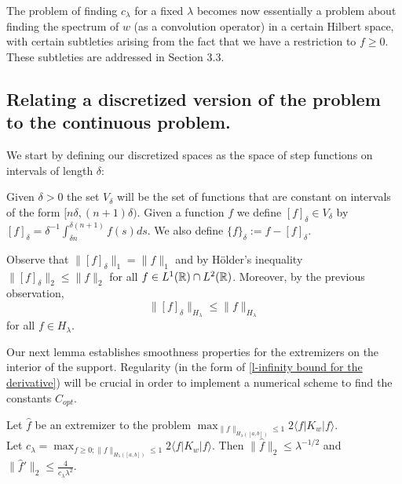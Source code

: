 The problem of finding $c_{\lambda}$ for a fixed $\lambda$ becomes now essentially a problem about finding the spectrum of $w$ (as a convolution operator) in a certain Hilbert space, with certain subtleties arising from the fact that we have a restriction to $f\ge 0$. These subtleties are addressed in Section 3.3. 

\subsection*{Relating a discretized version of the problem to the continuous problem.}  We start by defining our discretized spaces as the space of step functions on intervals of length $\delta$:


\begin{definition}
 Given $\delta>0$ the set $V_\delta$ will be the set of functions that are constant on intervals of the form $[n\delta, (n+1)\delta)$. Given a function $f$ we define $[f]_\delta \in V_\delta$ by $[f]_\delta = \delta^{-1}\int_{\delta n}^{\delta(n+1)} f(s) ds$. We also define $\{f\}_{\delta} := f-[f]_{\delta}$.
\end{definition}

Observe that $\|[f]_{\delta}\|_1=\|f\|_1$ and by H\"older's inequality $\|[f]_{\delta}\|_2\leq \|f\|_2$ for all $f\in L^{1}({\mathbb R})\cap L^{2}({\mathbb R})$. 
Moreover, by the previous observation, \begin{equation}\label{relacion entre normas en H}
\|[f]_{\delta}\|_{H_{\lambda}}\leq \|f\|_{H_{\lambda}} \end{equation}
for all $f\in H_{\lambda}$.


Our next lemma establishes smoothness properties for the extremizers on the interior of the support. %
Regularity (in the form of \ref{l-infinity bound for the derivative}) will be crucial  %
in order to implement a numerical scheme to find the constants $C_{opt}$.

\begin{lemma}\label{l-infinity bound for the derivative}
Let $\hat f$ be an extremizer to the problem $\max_{\|f\|_{H_\lambda ([a,b])}\le 1} 2\langle f|K_w|f\rangle
$.\\
Let $c_\lambda =  \max_{f\ge 0; \|f\|_{H_\lambda ([a,b])}\le 1} 2 \langle f|K_w|f\rangle
$. Then  $\|\hat f\|_{2} \le \lambda^{-1/2}$ and $\|\hat f'\|_{2} \le \frac{4}{c_\lambda \lambda^2}$.
\end{lemma}



